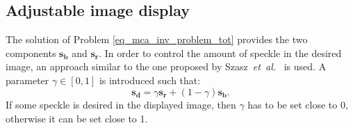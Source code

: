 \documentclass[conference]{IEEEtran}
\begin{document}
\subsection{Adjustable image display}
\label{subsec_final_image_display}
The solution of Problem \eqref{eq_mca_inv_problem_tot} provides the two components $\bm{s_b}$ and $\bm{s_r}$. In order to control the amount of speckle in the desired image, an approach similar to the one proposed by Szasz~\textit{et~al.}~\cite{Szasz_Ult_2016} is used. A parameter $\gamma \in \left[0,1\right]$ is introduced such that: 
\begin{equation}
\bm{s_d} = \gamma \bm{s_r} + (1-\gamma) \bm{s_b}.
\end{equation}
If some speckle is desired in the displayed image, then $\gamma$ has to be set close to 0, otherwise it can be set close to 1.
\end{document}
